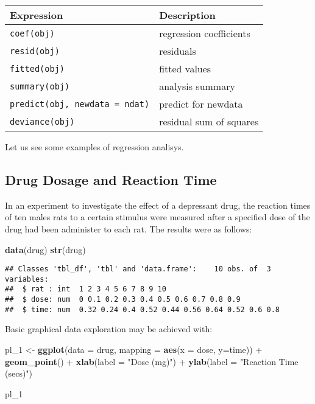 \documentclass[]{book}
\newenvironment{Shaded}{\begin{snugshade}}{\end{snugshade}}
\newcommand{\KeywordTok}[1]{\textcolor[rgb]{0.13,0.29,0.53}{\textbf{{#1}}}}
\newcommand{\DataTypeTok}[1]{\textcolor[rgb]{0.13,0.29,0.53}{{#1}}}
\newcommand{\StringTok}[1]{\textcolor[rgb]{0.31,0.60,0.02}{{#1}}}
\newcommand{\NormalTok}[1]{{#1}}
\begin{document}
\begin{longtable}[]{@{}ll@{}}
\toprule
Expression & Description\tabularnewline
\midrule
\endhead
\texttt{coef(obj)} & regression coefficients\tabularnewline
\texttt{resid(obj)} & residuals\tabularnewline
\texttt{fitted(obj)} & fitted values\tabularnewline
\texttt{summary(obj)} & analysis summary\tabularnewline
\texttt{predict(obj,\ newdata\ =\ ndat)} & predict for
newdata\tabularnewline
\texttt{deviance(obj)} & residual sum of squares\tabularnewline
\bottomrule
\end{longtable}

Let us see some examples of regression analisys.

\clearpage

\subsection{Drug Dosage and Reaction
Time}\label{drug-dosage-and-reaction-time}

In an experiment to investigate the effect of a depressant drug, the
reaction times of ten males rats to a certain stimulus were measured
after a specified dose of the drug had been administer to each rat. The
results were as follows:

\begin{Shaded}
\begin{Highlighting}[]
\KeywordTok{data}\NormalTok{(drug)}
\KeywordTok{str}\NormalTok{(drug)}
\end{Highlighting}
\end{Shaded}

\begin{verbatim}
## Classes 'tbl_df', 'tbl' and 'data.frame':    10 obs. of  3 variables:
##  $ rat : int  1 2 3 4 5 6 7 8 9 10
##  $ dose: num  0 0.1 0.2 0.3 0.4 0.5 0.6 0.7 0.8 0.9
##  $ time: num  0.32 0.24 0.4 0.52 0.44 0.56 0.64 0.52 0.6 0.8
\end{verbatim}

Basic graphical data exploration may be achieved with:

\begin{Shaded}
\begin{Highlighting}[]
\NormalTok{pl_1 <-}\StringTok{ }\KeywordTok{ggplot}\NormalTok{(}\DataTypeTok{data =} \NormalTok{drug, }\DataTypeTok{mapping =} \KeywordTok{aes}\NormalTok{(}\DataTypeTok{x =} \NormalTok{dose, }\DataTypeTok{y=}\NormalTok{time)) +}\StringTok{ }
\StringTok{  }\KeywordTok{geom_point}\NormalTok{() +}
\StringTok{  }\KeywordTok{xlab}\NormalTok{(}\DataTypeTok{label =} \StringTok{"Dose (mg)"}\NormalTok{) +}
\StringTok{  }\KeywordTok{ylab}\NormalTok{(}\DataTypeTok{label =} \StringTok{"Reaction Time (secs)"}\NormalTok{)}

\NormalTok{pl_1}
\end{Highlighting}
\end{Shaded}
\end{document}
